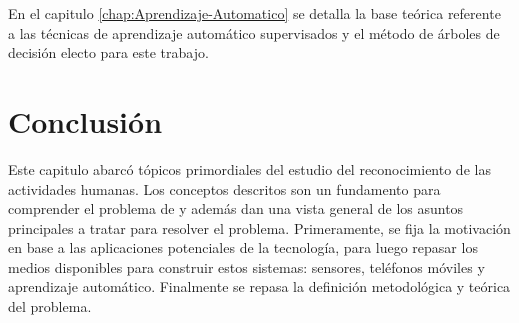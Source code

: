En el capitulo \ref{chap:Aprendizaje-Automatico} se detalla la base
teórica referente a las técnicas de aprendizaje automático supervisados
y el método de árboles de decisión electo para este trabajo.

\section{Conclusión}

\label{sec27:conclusion}Este capitulo abarcó tópicos primordiales
del estudio del reconocimiento de las actividades humanas. Los conceptos
descritos son un fundamento para comprender el problema de 
y además dan una vista general de los asuntos principales a tratar
para resolver el problema. Primeramente, se fija la motivación en
base a las aplicaciones potenciales de la tecnología, para luego repasar
los medios disponibles para construir estos sistemas: sensores, teléfonos
móviles y aprendizaje automático. Finalmente se repasa la definición
metodológica y teórica del problema. 
